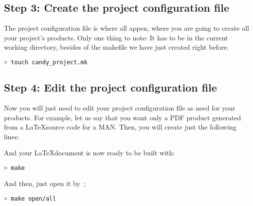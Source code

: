\subsection{Step 3: Create the project configuration file}

The project configuration file is where all appen, where you are going to create all your project's
products. Only one thing to note: It has to be in the current working directory, besides of the
makefile we have just created right before.

\begin{lstlisting}[language=bash]
> touch candy_project.mk
\end{lstlisting}


\subsection{Step 4: Edit the project configuration file}

Now you will just need to edit your project configuration file as need for your products. For example,
let us say that you want only a PDF product generated from a \LaTeX source code for a MAN. Then, you
will create just the following lines:



And your \LaTeX document is now ready to be built with:

\begin{lstlisting}[language=bash]
> make
\end{lstlisting}

And then, just open it by~;

\begin{lstlisting}[language=bash]
> make open/all
\end{lstlisting}


